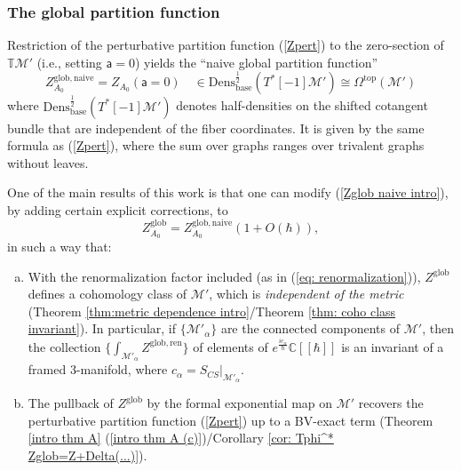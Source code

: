 \documentclass[11pt,a4paper]{amsart}
\theoremstyle{plain} %
\theoremstyle{definition}
\theoremstyle{remark}
\newcommand{\mr}{\mathrm}
\newcommand{\sfa}{\mathsf{a}}
\newcommand{\M}{\mathcal{M}}
\begin{document}
\subsubsection{The global partition function}\label{sss intro Zglob}
Restriction of the perturbative partition function (\ref{Zpert}) to the zero-section of $\mathbb{T}\M'$ (i.e., setting $\sfa=0$)  yields the ``naive global partition function''
\begin{equation}\label{Zglob naive intro}
    Z^\mr{glob,naive}_{A_0}=Z_{A_0}(\sfa=0) \quad \in  \mr{Dens}^{\frac12}_{\mr{base}}(T^*[-1]\M')\cong \Omega^\mr{top}(\M')
\end{equation}
where $\mr{Dens}^{\frac12}_{\mr{base}}(T^*[-1]\M')$ denotes half-densities on the shifted cotangent bundle that are independent of the fiber coordinates. 
It is given by the same formula as (\ref{Zpert}), where the sum over graphs ranges over trivalent graphs without leaves.


One of the main results of this work is that one can modify (\ref{Zglob naive intro}), by adding certain explicit corrections,
to
\begin{equation}
    Z^\mr{glob}_{A_0}= Z^\mr{glob,naive}_{A_0} (1+O(\hbar)),
\end{equation}
in such a way that:
\begin{enumerate}[(a)]
    \item 
    With the renormalization %
    factor included (as in (\ref{eq: renormalization})), $Z^\mr{glob}$ defines a cohomology class of $\M'$, which is \emph{independent of the metric} (Theorem \ref{thm:metric dependence intro}/Theorem \ref{thm: coho class invariant}). 
    In particular, if $\{\M'_\alpha\}$ are the connected components of $\M'$, then the collection $\{\int_{\M'_\alpha} Z^\mr{glob,ren}\}$ of elements of $e^{\frac{ic_\alpha}{\hbar}}\mathbb{C}[[\hbar]]$ is an invariant of a framed 3-manifold, where $c_\alpha=S_{CS}|_{\M'_\alpha}$.
    \item The pullback of $Z^\mr{glob}$ by the formal exponential map on $\M'$ recovers the perturbative partition function (\ref{Zpert}) up to a BV-exact term (Theorem \ref{intro thm A} (\ref{intro thm A (c)})/Corollary \ref{cor: Tphi^* Zglob=Z+Delta(...)}).
\end{enumerate}
\end{document}
